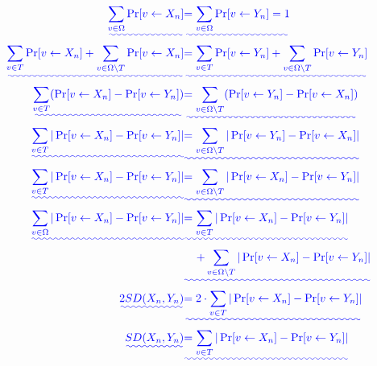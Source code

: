 \documentclass[11pt]{book}
\providecommand{\DIFadd}[1]{{\protect\color{blue}\uwave{#1}}} %
\begin{document}
\begin{align*}
    \DIFadd{\sum\limits_{v \in \Omega} \Pr[v \leftarrow X_n] }&\DIFadd{= \sum\limits_{v \in \Omega} \Pr[v \leftarrow Y_n] = 1 }\\
    \DIFadd{\sum\limits_{v \in T}\Pr[v \leftarrow X_n] + \sum\limits_{v \in \Omega\setminus T}\Pr[v \leftarrow X_n] }&\DIFadd{= \sum\limits_{v \in T}\Pr[v \leftarrow Y_n] + \sum\limits_{v \in \Omega\setminus T}\Pr[v \leftarrow Y_n]}\\
    \DIFadd{\sum\limits_{v \in T}(\Pr[v \leftarrow X_n] - \Pr[v \leftarrow Y_n]) }&\DIFadd{= \sum\limits_{v \in \Omega \setminus T}(\Pr[v \leftarrow Y_n] - \Pr[v \leftarrow X_n])}\\
    \DIFadd{\sum\limits_{v \in T}|\Pr[v \leftarrow X_n] - \Pr[v \leftarrow Y_n]| }&\DIFadd{= \sum\limits_{v \in \Omega \setminus T}|\Pr[v \leftarrow Y_n] - \Pr[v \leftarrow X_n]|}\\
    \DIFadd{\sum\limits_{v \in T}|\Pr[v \leftarrow X_n] - \Pr[v \leftarrow Y_n]| }&\DIFadd{= \sum\limits_{v \in \Omega \setminus T}|\Pr[v \leftarrow X_n] - \Pr[v \leftarrow Y_n]|}\\
    \DIFadd{\sum\limits_{v \in \Omega}|\Pr[v \leftarrow X_n] - \Pr[v \leftarrow Y_n]| }&\DIFadd{= \sum\limits_{v \in T}|\Pr[v \leftarrow X_n] - \Pr[v \leftarrow Y_n]|}\\
    &\DIFadd{\;\;\;\; + \sum\limits_{v \in \Omega \setminus T}|\Pr[v \leftarrow X_n] - \Pr[v \leftarrow Y_n]|}\\
    \DIFadd{2SD(X_n, Y_n) }&\DIFadd{= 2 \cdot \sum\limits_{v \in T}|\Pr[v \leftarrow X_n] - \Pr[v \leftarrow Y_n]|}\\
    \DIFadd{SD(X_n, Y_n) }&\DIFadd{= \sum\limits_{v \in T}|\Pr[v \leftarrow X_n] - \Pr[v \leftarrow Y_n]|
}\end{align*}
\end{document}
